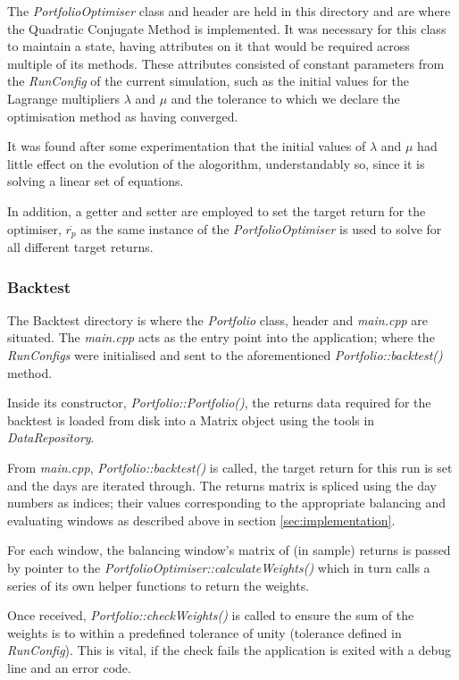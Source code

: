 \documentclass{article}
\begin{document}
The \textit{PortfolioOptimiser} class and header are held in this directory and are where the Quadratic Conjugate Method is implemented. It was necessary for this class to maintain a state, having attributes on it that would be required across multiple of its methods. These attributes consisted of constant parameters from the \textit{RunConfig} of the current simulation, such as the initial values for the Lagrange multipliers $\lambda$ and $\mu$ and the tolerance to which we declare the optimisation method as having converged. 

It was found after some experimentation that the initial values of $\lambda$ and $\mu$ had little effect on the evolution of the alogorithm, understandably so, since it is solving a linear set of equations.

In addition, a getter and setter are employed to set the target return for the optimiser, $\overline{r_p}$ as the same instance of the \textit{PortfolioOptimiser} is used to solve for all different target returns.



\subsubsection{Backtest}
\label{sec:backtestcode}

The Backtest directory is where the \textit{Portfolio} class, header and \textit{main.cpp} are situated. The \textit{main.cpp} acts as the entry point into the application; where the \textit{RunConfigs} were initialised and sent to the aforementioned \textit{Portfolio::backtest()} method.

Inside its constructor, \textit{Portfolio::Portfolio()}, the returns data required for the backtest is loaded from disk into a Matrix object using the tools in \textit{DataRepository}.

From \textit{main.cpp}, \textit{Portfolio::backtest()} is called, the target return for this run is set and the days are iterated through. The returns matrix is spliced using the day numbers as indices; their values corresponding to the appropriate balancing and evaluating windows as described above in section \ref{sec:implementation}.

For each window, the balancing window's matrix of (in sample) returns is passed by pointer to the \textit{PortfolioOptimiser::calculateWeights()} which in turn calls a series of its own helper functions to return the weights. 

Once received, \textit{Portfolio::checkWeights()} is called to ensure the sum of the weights is to within a predefined tolerance of unity (tolerance defined in \textit{RunConfig}). This is vital, if the check fails the application is exited with a debug line and an error code. 
\end{document}
